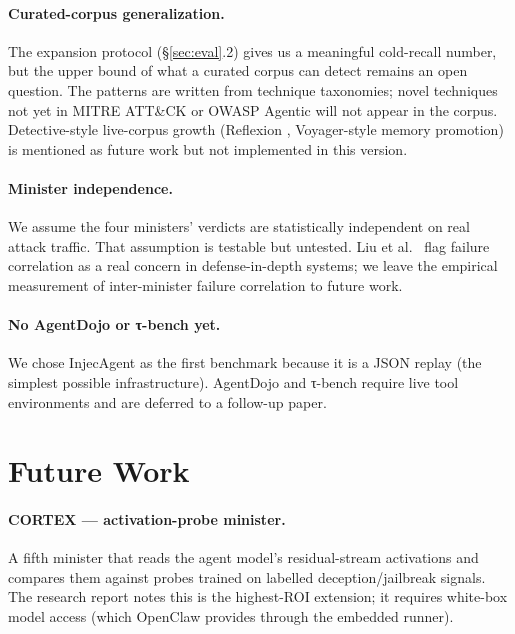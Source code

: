 \documentclass[11pt]{article}
\begin{document}
\paragraph{Curated-corpus generalization.} The expansion protocol
(\S\ref{sec:eval}.2) gives us a meaningful cold-recall number, but the
upper bound of what a curated corpus can detect remains an open question.
The patterns are written from technique taxonomies; novel techniques
not yet in MITRE ATT\&CK or OWASP Agentic will not appear in the corpus.
Detective-style live-corpus growth (Reflexion \cite{shinn2023reflexion},
Voyager-style memory promotion) is mentioned as future work but not
implemented in this version.

\paragraph{Minister independence.} We assume the four ministers'
verdicts are statistically independent on real attack traffic. That
assumption is testable but untested. Liu et al.\ \cite{liu2026clawdesign}
flag failure correlation as a real concern in defense-in-depth systems;
we leave the empirical measurement of inter-minister failure
correlation to future work.

\paragraph{No AgentDojo or τ-bench yet.} We chose InjecAgent as the first
benchmark because it is a JSON replay (the simplest possible
infrastructure). AgentDojo and τ-bench require live tool environments
and are deferred to a follow-up paper.

\section{Future Work}
\label{sec:future}

\paragraph{CORTEX — activation-probe minister.} A fifth minister that
reads the agent model's residual-stream activations and compares them
against probes trained on labelled deception/jailbreak signals. The
research report notes this is the highest-ROI extension; it requires
white-box model access (which OpenClaw provides through the embedded
runner).
\end{document}
